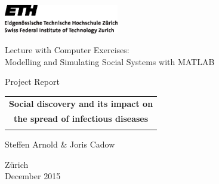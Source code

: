 
\thispagestyle{empty}

\begin{center}
\includegraphics[width=5cm]{ETHlogo.eps}

\bigskip


\bigskip


\bigskip


\LARGE{ 	Lecture with Computer Exercises:\\ }
\LARGE{ Modelling and Simulating Social Systems with MATLAB\\}

\bigskip

\bigskip

\small{Project Report}\\

\bigskip

\bigskip

\bigskip

\bigskip


\begin{tabular}{c}
\\
\textbf{\LARGE{Social discovery and its impact on }}\\
\textbf{\LARGE{the spread of infectious diseases}}\\
\\
\end{tabular}
\bigskip

\bigskip

\bigskip

\LARGE{Steffen Arnold \& Joris Cadow}



\bigskip

\bigskip

\bigskip

\bigskip

\bigskip

\bigskip

\bigskip

\bigskip

Z\"urich\\
December 2015\\

\end{center}
